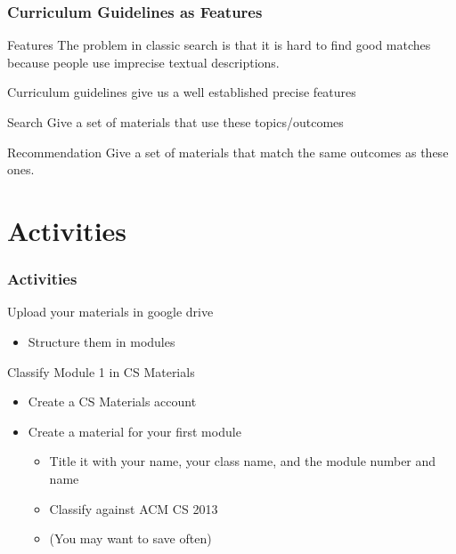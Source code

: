 \documentclass[aspectratio=169]{beamer}
\begin{document}
\begin{frame}
  \frametitle{Curriculum Guidelines as Features}

  \begin{block}{Features}
    The problem in classic search is that it is hard to find good
    matches because people use imprecise textual descriptions.

    Curriculum guidelines give us a well established precise features
  \end{block}

  \begin{block}{Search}
    Give a set of materials that use these topics/outcomes
  \end{block}

  \begin{block}{Recommendation}
    Give a set of materials that match the same outcomes as these ones.
  \end{block}
  
\end{frame}


\section{Activities}

\begin{frame}
  \frametitle{Activities}

  \begin{block}{Upload your materials in google drive}
    \begin{itemize}
    \item Structure them in modules
    \end{itemize}
  \end{block}


  \begin{block}{Classify Module 1 in CS Materials}
    \begin{itemize}
    \item Create a CS Materials account
    \item Create a material for your first module
      \begin{itemize}
      \item Title it with your name, your class name,  and the module number and name
      \item Classify against ACM CS 2013
      \item (You may want to save often)
      \end{itemize}
    \end{itemize}
  \end{block}
  
\end{frame}
\end{document}
